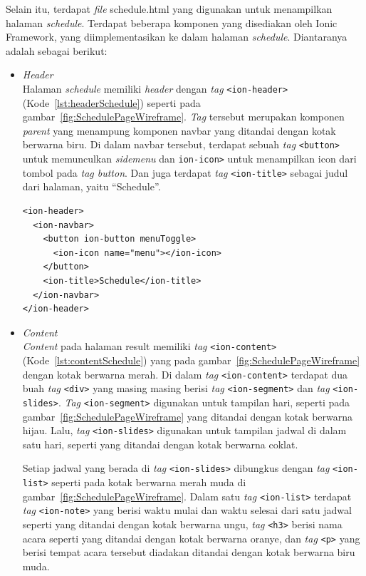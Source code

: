 \begin{enumerate}
	Selain itu, terdapat \textit{file} schedule.html yang digunakan untuk menampilkan halaman \textit{schedule}. Terdapat beberapa komponen yang disediakan oleh Ionic Framework, yang diimplementasikan ke dalam halaman \textit{schedule}. Diantaranya adalah sebagai berikut:
	
	\begin{itemize}
		\item \textit{Header} \\
		Halaman \textit{schedule} memiliki \textit{header} dengan \textit{tag} \texttt{<ion-header>} (Kode~\ref{lst:headerSchedule}) seperti pada gambar~\ref{fig:SchedulePageWireframe}. \textit{Tag} tersebut merupakan komponen \textit{parent} yang menampung komponen navbar yang ditandai dengan kotak berwarna biru. Di dalam navbar tersebut, terdapat sebuah \textit{tag} \texttt{<button>} untuk memunculkan \textit{sidemenu} dan \texttt{ion-icon>} untuk menampilkan icon dari tombol pada \textit{tag button}. Dan juga terdapat \textit{tag} \texttt{<ion-title>} sebagai judul dari halaman, yaitu ``Schedule''.
		
\begin{lstlisting}[label={lst:headerSchedule}, caption=\textit{Header} pada schedule.html]
<ion-header>
  <ion-navbar>
    <button ion-button menuToggle>
      <ion-icon name="menu"></ion-icon>
    </button>
    <ion-title>Schedule</ion-title>
  </ion-navbar>
</ion-header>
\end{lstlisting} 

		\item \textit{Content} \\
		\textit{Content} pada halaman result memiliki \textit{tag} \texttt{<ion-content>} (Kode~\ref{lst:contentSchedule}) yang pada gambar~\ref{fig:SchedulePageWireframe} dengan kotak berwarna merah. Di dalam \textit{tag} \texttt{<ion-content>} terdapat dua buah \textit{tag} \texttt{<div>} yang masing masing berisi \textit{tag} \texttt{<ion-segment>} dan \textit{tag} \texttt{<ion-slides>}. \textit{Tag} \texttt{<ion-segment>} digunakan untuk tampilan hari, seperti pada gambar~\ref{fig:SchedulePageWireframe} yang ditandai dengan kotak berwarna hijau. Lalu, \textit{tag} \texttt{<ion-slides>} digunakan untuk tampilan jadwal di dalam satu hari, seperti yang ditandai dengan kotak berwarna coklat. 
		
		Setiap jadwal yang berada di \textit{tag} \texttt{<ion-slides>} dibungkus dengan \textit{tag} \texttt{<ion-list>} seperti pada kotak berwarna merah muda di gambar~\ref{fig:SchedulePageWireframe}. Dalam satu \textit{tag} \texttt{<ion-list>} terdapat \textit{tag} \texttt{<ion-note>} yang berisi waktu mulai dan waktu selesai dari satu jadwal seperti yang ditandai dengan kotak berwarna ungu, \textit{tag} \texttt{<h3>} berisi nama acara seperti yang ditandai dengan kotak berwarna oranye, dan \textit{tag} \texttt{<p>} yang berisi tempat acara tersebut diadakan ditandai dengan kotak berwarna biru muda.


\end{itemize}
\end{enumerate}
